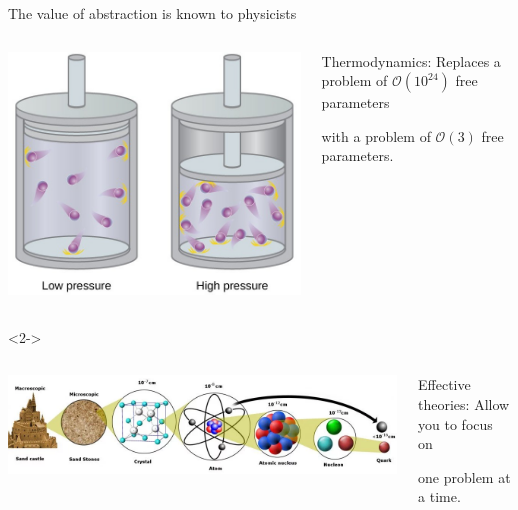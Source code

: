 \documentclass[aspectratio=169]{beamer}
\begin{document}
\begin{frame}{The value of abstraction is known to physicists}
\large
\vspace{0.5 cm}
\begin{columns}
\includegraphics[width=\linewidth]{idealgas.jpg}

\begin{block}{\LARGE Thermodynamics:}
\vspace{0.1 cm}
Replaces a problem of $\mathcal{O}(10^{24})$ free parameters

\vspace{0.1 cm}
with a problem of $\mathcal{O}(3)$ free parameters.
\end{block}
\end{columns}

\vspace{0.8 cm}
\begin{uncoverenv}<2->
\begin{columns}
\includegraphics[width=\linewidth]{atom-proton-quark.png}

\begin{block}{\LARGE Effective theories:}
\vspace{0.2 cm}
Allow you to focus on

\vspace{0.1 cm}
one problem at a time.
\end{block}
\end{columns}
\end{uncoverenv}
\end{frame}
\end{document}
